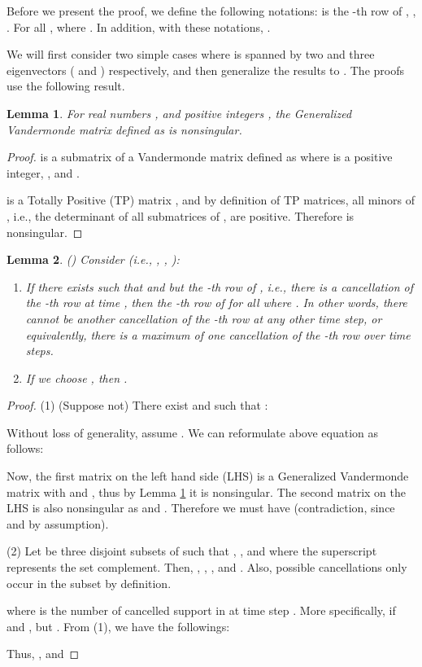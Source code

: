 \documentclass[journal]{IEEEtran}
\newtheorem{lem}{\bf{Lemma}}
\begin{document}
Before we present the proof, we define the following notations:  is the -th row of , , . For all ,  where .
In addition, with these notations, .



We will first consider two simple cases where  is spanned by two and three eigenvectors ( and ) respectively, and then generalize the results to . The proofs use the following result.

\begin{lem} \label{lem:gv}
For  real numbers , and  positive integers , the Generalized Vandermonde matrix  defined as
\nonumber
is nonsingular.
\end{lem}
 
\begin{proof}
 is a submatrix of a Vandermonde matrix  defined as
\nonumber
where  is a positive integer, ,  and .

 is a Totally Positive (TP) matrix \cite{fallat2011tnm}, and by definition of TP matrices, all minors of , i.e., the determinant of all submatrices of , are positive. Therefore  is nonsingular.
\end{proof}




\begin{lem}\label{lem:two_vec}
()  Consider  (i.e.,  , , ):
\begin{enumerate}
\item 
If there exists  such that  and  but the -th row of , i.e., there is a cancellation of the -th row at time , then the -th row of  for all  where . In other words, there cannot be another cancellation of the -th row at any other time step, or equivalently, there is a maximum of one cancellation of the -th row over  time steps.
\item 
If we choose , then . 
\end{enumerate}
\end{lem}


\begin{proof}
(1) (Suppose not) There exist  and  such that :

Without loss of generality, assume . We can reformulate above equation as follows:

Now, the first matrix on the left hand side (LHS) is a Generalized Vandermonde matrix  with  and , thus by Lemma \ref{lem:gv} it is nonsingular. The second matrix on the LHS is also nonsingular as  and . Therefore we must have  (contradiction, since  and  by assumption).

(2) Let  be three disjoint subsets of  such that , , and  where the superscript  represents the set complement. Then, , , ,   and . 
Also, possible cancellations only occur in the subset  by definition. 

where  is the number of cancelled support in  at time step . 
More specifically,  if  and , but .
From (1), we have the followings:

Thus, , and

\end{proof}
\end{document}
